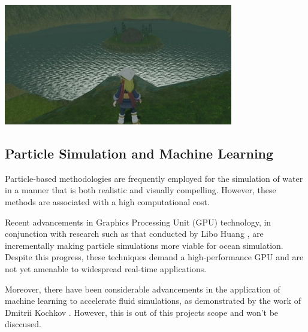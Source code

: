 \begin{minipage}{1\textwidth}
    \centering
    \includegraphics[width=0.75\textwidth]{"images/pokemon_water_tiling.png"}
    \label{fig:pokemon_water_tiling}
\end{minipage}

\subsection{Particle Simulation and Machine Learning}
Particle-based methodologies are frequently employed for the simulation of water in a manner that is both realistic and visually compelling. However, these methods are associated with a high computational cost.

Recent advancements in Graphics Processing Unit (GPU) technology, in conjunction with research such as that conducted by Libo Huang \cite{huang2021}, are incrementally making particle simulations more viable for ocean simulation. Despite this progress, these techniques demand a high-performance GPU and are not yet amenable to widespread real-time applications.

Moreover, there have been considerable advancements in the application of machine learning to accelerate fluid simulations, as demonstrated by the work of Dmitrii Kochkov \cite{kochkov2021machine}. However, this is out of this projects scope and won't be disccused.








